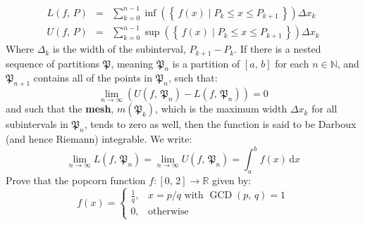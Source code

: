 \documentclass{article}
\theoremstyle{normal}
\begin{document}
        \begin{equation}
            \begin{array}{rcl}
                \displaystyle
                L(f,\,P)
                &=&
                \displaystyle
                \sum_{k=0}^{n-1}
                    \inf\left(
                        \left\{\,
                            f(x)\;\big|\;P_{k}\leq{x}\leq{P}_{k+1}\,
                        \right\}
                    \right)
                    \Delta{x}_{k}\\[1.5em]
                    \displaystyle
                    U(f,\,P)
                    &=&
                    \displaystyle
                    \sum_{k=0}^{n-1}
                        \sup\left(
                            \left\{\,
                                f(x)\;\big|\;P_{k}\leq{x}\leq{P}_{k+1}\,
                            \right\}
                        \right)
                        \Delta{x}_{k}
            \end{array}
        \end{equation}
        Where $\Delta_{k}$ is the width of the subinterval, $P_{k+1}-P_{k}$.
        If there is a nested sequence of partitions $\mathfrak{P}$, meaning
        $\mathfrak{P}_{n}$ is a partition of $[a,\,b]$ for each
        $n\in\mathbb{N}$, and $\mathfrak{P}_{n+1}$ contains all of the points
        in $\mathfrak{P}_{n}$, such that:
        \begin{equation}
            \lim_{n\rightarrow\infty}\left(
                U(f,\,\mathfrak{P}_{n})-L(f,\,\mathfrak{P}_{n})
            \right)
            =0
        \end{equation}
        and such that the \textbf{mesh}, $m(\mathfrak{P}_{k})$, which is the
        maximum width $\Delta{x}_{k}$ for all subintervals in
        $\mathfrak{P}_{n}$, tends to zero as well,
        then the function is said to be Darboux (and hence Riemann) integrable.
        We write:
        \begin{equation}
            \lim_{n\rightarrow\infty}L(f,\,\mathfrak{P}_{n})
            =\lim_{n\rightarrow\infty}U(f,\,\mathfrak{P}_{n})
            =\int_{a}^{b}f(x)\,\textrm{d}x
        \end{equation}
        Prove that the popcorn function $f:[0,\,2]\rightarrow\mathbb{R}$
        given by:
        \begin{equation}
            f(x)=
            \begin{cases}
                \frac{1}{q},&x=p/q\textrm{ with }\operatorname{GCD}(p,\,q)=1\\
                0,&\textrm{otherwise}
            \end{cases}
        \end{equation}
\end{document}
